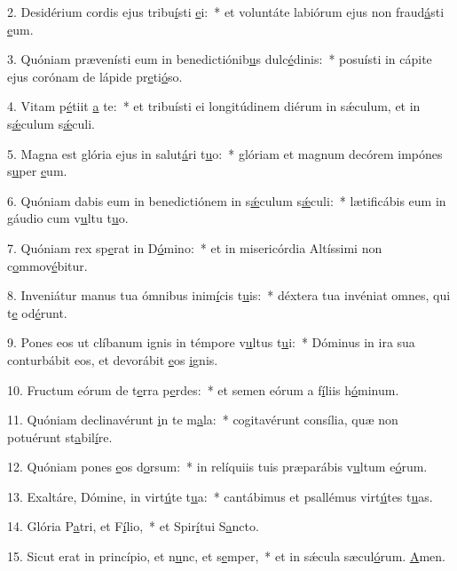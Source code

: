2. Desidérium cordis ejus tribu\uline{í}sti \uline{e}i:~* et voluntáte labiórum ejus non fraud\uline{á}sti \uline{e}um.\par 
3. Quóniam prævenísti eum in benedictiónib\uline{u}s dulc\uline{é}dinis:~* posuísti in cápite ejus corónam de lápide pr\uline{e}ti\uline{ó}so.\par 
4. Vitam p\uline{é}tiit \uline{a} te:~* et tribuísti ei longitúdinem diérum in sǽculum, et in s\uline{ǽ}culum s\uline{ǽ}culi.\par 
5. Magna est glória ejus in salut\uline{á}ri t\uline{u}o:~* glóriam et magnum decórem impónes s\uline{u}per \uline{e}um.\par 
6. Quóniam dabis eum in benedictiónem in s\uline{ǽ}culum s\uline{ǽ}culi:~* lætificábis eum in gáudio cum v\uline{u}ltu t\uline{u}o.\par 
7. Quóniam rex sp\uline{e}rat in D\uline{ó}mino:~* et in misericórdia Altíssimi non c\uline{o}mmov\uline{é}bitur.\par 
8. Inveniátur manus tua ómnibus inim\uline{í}cis t\uline{u}is:~* déxtera tua invéniat omnes, qui t\uline{e} od\uline{é}runt.\par 
9. Pones eos ut clíbanum ignis in témpore v\uline{u}ltus t\uline{u}i:~* Dóminus in ira sua conturbábit eos, et devorábit \uline{e}os \uline{i}gnis.\par 
10. Fructum eórum de t\uline{e}rra p\uline{e}rdes:~* et semen eórum a f\uline{í}liis h\uline{ó}minum.\par 
11. Quóniam declinavérunt \uline{i}n te m\uline{a}la:~* cogitavérunt consília, quæ non potuérunt st\uline{a}bil\uline{í}re.\par 
12. Quóniam pones \uline{e}os d\uline{o}rsum:~* in relíquiis tuis præparábis v\uline{u}ltum e\uline{ó}rum.\par 
13. Exaltáre, Dómine, in virt\uline{ú}te t\uline{u}a:~* cantábimus et psallémus virt\uline{ú}tes t\uline{u}as.\par 
14. Glória P\uline{a}tri, et F\uline{í}lio,~* et Spir\uline{í}tui S\uline{a}ncto.\par 
15. Sicut erat in princípio, et n\uline{u}nc, et s\uline{e}mper,~* et in sǽcula sæcul\uline{ó}rum. \uline{A}men.\par 
